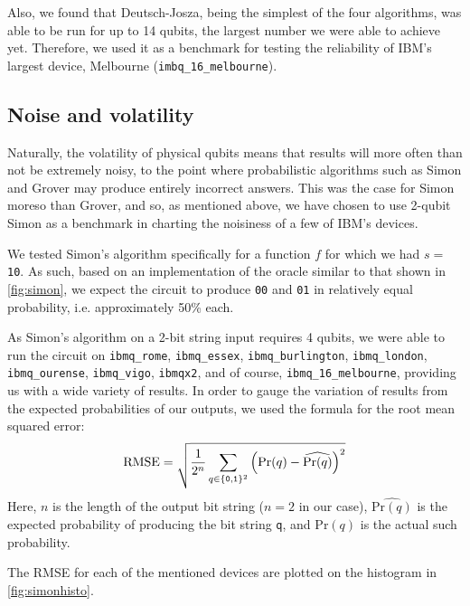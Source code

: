 \documentclass[12pt]{article}
\begin{document}
Also, we found that Deutsch-Josza, being the simplest of the four algorithms, was able to be run for up to 14 qubits, the largest number we were able to achieve yet.
Therefore, we used it as a benchmark for testing the reliability of IBM's largest device, Melbourne (\texttt{imbq\_16\_melbourne}).

\subsection{Noise and volatility}
Naturally, the volatility of physical qubits means that results will more often than not be extremely noisy, to the point where probabilistic algorithms such as Simon and Grover may produce entirely incorrect answers.
This was the case for Simon moreso than Grover, and so, as mentioned above, we have chosen to use 2-qubit Simon as a benchmark in charting the noisiness of a few of IBM's devices.

We tested Simon's algorithm specifically for a function $f$ for which we had $s = $ \texttt{10}.
As such, based on an implementation of the oracle similar to that shown in \autoref{fig:simon}, we expect the circuit to produce \texttt{00} and \texttt{01} in relatively equal probability, i.e. approximately 50\% each.

As Simon's algorithm on a 2-bit string input requires 4 qubits, we were able to run the circuit on \texttt{ibmq\_rome}, \texttt{ibmq\_essex}, \texttt{ibmq\_burlington}, \texttt{ibmq\_london}, \texttt{ibmq\_ourense}, \texttt{ibmq\_vigo}, \texttt{ibmqx2}, and of course, \texttt{ibmq\_16\_melbourne}, providing us with a wide variety of results.
In order to gauge the variation of results from the expected probabilities of our outputs, we used the formula for the root mean squared error:
\begin{align*}
    \mathrm{RMSE} = \sqrt{\frac{1}{2^n}\sum_{q\in\{\text{\texttt{0}},\text{\texttt{1}}\}^2}\left(\mathrm{Pr}(q) - \widehat{\mathrm{Pr}(q)}\right)^2}
\end{align*}
Here, $n$ is the length of the output bit string ($n=2$ in our case), $\widehat{\mathrm{Pr}(q)}$ is the expected probability of producing the bit string \texttt{q}, and $\mathrm{Pr}(q)$ is the actual such probability.

The RMSE for each of the mentioned devices are plotted on the histogram in \autoref{fig:simonhisto}.
\end{document}
